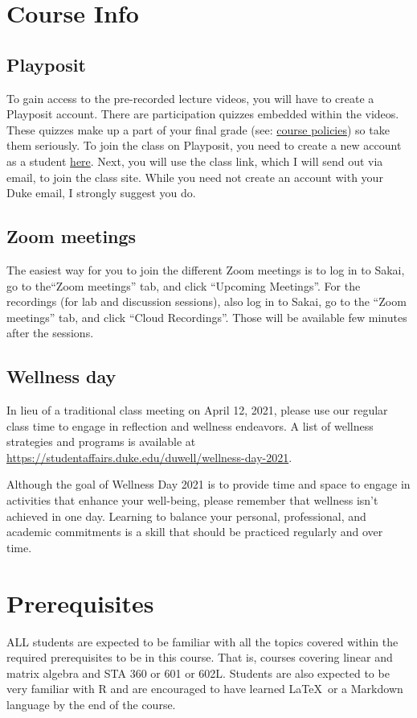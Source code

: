 \documentclass[11pt, a4paper]{article}
\begin{document}
\section{Course Info}
\subsection{Playposit}
To gain access to the pre-recorded lecture videos, you will have to create a Playposit account. There are participation quizzes embedded within the videos. These quizzes make up a part of your final grade (see: \href{https://sta-610l-s21.github.io/Course-Website/policies/}{course policies}) so take them seriously. To join the class on Playposit, you need to create a new account as a student \href{https://www.playposit.com/join}{here}. Next, you will use the class link, which I will send out via email, to join the class site. While you need not create an account with your Duke email, I strongly suggest you do.

\subsection{Zoom meetings}
The easiest way for you to join the different Zoom meetings is to log in to Sakai, go to the``Zoom meetings'' tab, and click ``Upcoming Meetings''. For the recordings (for lab and discussion sessions), also log in to Sakai, go to the ``Zoom meetings'' tab, and click ``Cloud Recordings''. Those will be available few minutes after the sessions.

\subsection{Wellness day}

In lieu of a traditional class meeting on April 12, 2021, please use our regular class time to engage in reflection and wellness endeavors. A list of wellness strategies and programs is available at \url{https://studentaffairs.duke.edu/duwell/wellness-day-2021}.

Although the goal of Wellness Day 2021 is to provide time and space to engage in activities that enhance your well-being, please remember that wellness isn’t achieved in one day.  Learning to balance your personal, professional, and academic commitments is a skill that should be practiced regularly and over time.


\section{Prerequisites}
ALL students are expected to be familiar with all the topics covered within the required prerequisites to be in this course. That is, courses covering linear and matrix algebra and STA 360 or 601 or 602L. Students are also expected to be very familiar with \textsf{R} and are encouraged to have learned \LaTeX \ or a Markdown language by the end of the course.
\end{document}
